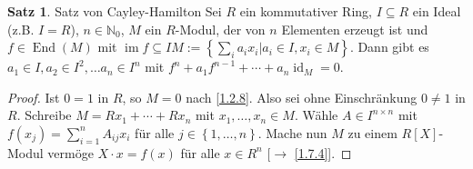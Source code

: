 \documentclass[
twoside=semi,
fontsize=12,
DIV=12, 
cleardoublepage=current,
leqno,
headings=optiontoheadandtoc, 
toc=idx
]{scrbook}
\newcommand{\N}{\mathbb{N}}
\newcommand{\set}[1]{\left\{ #1 \right\}}
\DeclareMathOperator{\im}{im}
\DeclareMathOperator{\id}{id}
\DeclareMathOperator{\End}{End}
\theoremstyle{definition}
\newtheorem{satz}[definition]{Satz}
\begin{document}
	\begin{satz}\label{1.7.5}
		Satz von Cayley-Hamilton\newline
		Sei $R$ ein kommutativer Ring, $I \subseteq R$ ein Ideal (z.B. $I = R$), $n\in \N_0$, $M$ ein $R$-Modul, der von $n$ Elementen erzeugt ist und $f \in \End(M)$ mit 
		$\im f \subseteq IM := \set{\sum_i a_ix_i|a_i \in I, x_i \in M}$. 
		Dann gibt es $a_1 \in I, a_2 \in I^2, \dots a_n \in I^n$ mit $f^n + a_1f^{n-1} + \cdots + a_n \id_M = 0$.
		
		\begin{proof}
			Ist $0 = 1$ in $R$, so $M = 0$ nach \ref{1.2.8}. Also sei ohne Einschr\"ankung $0\neq 1$ in $R$. Schreibe 
			$M = Rx_1 + \cdots + Rx_n$ mit $x_1, \dots, x_n \in M$. W\"ahle $A \in I^{n\times n}$ mit $f(x_j) = \sum_{i=1}^n A_{ij}x_i$ f\"ur alle $j \in \set{1, \dots, n}$.
			Mache nun $M$ zu einem $R[X]$-Modul verm\"oge $X \cdot x = f(x)$ f\"ur alle $x \in R^n$ [$\to$ \ref{1.7.4}].
			

\end{proof}
\end{satz}
\end{document}
